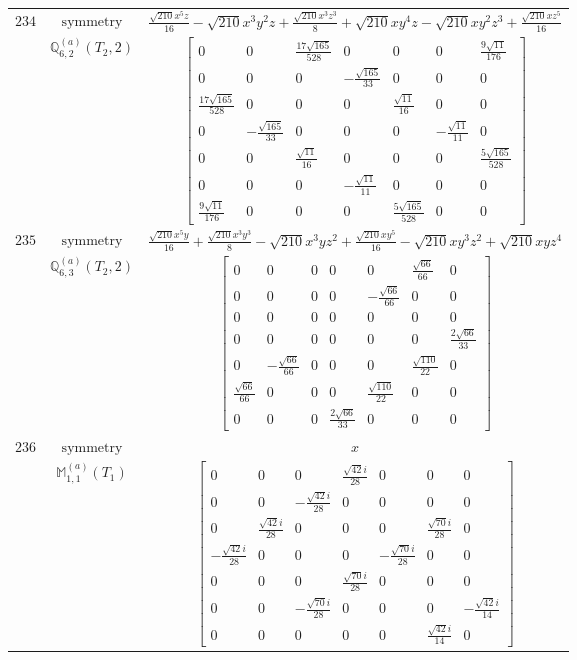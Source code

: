 \documentclass[fleqn,8pt,landscape]{jsarticle}
\begin{document}
\begin{longtable}{ccc}
$ 234 $ & $ \text{symmetry} $ & $ \frac{\sqrt{210} x^{5} z}{16} - \sqrt{210} x^{3} y^{2} z + \frac{\sqrt{210} x^{3} z^{3}}{8} + \sqrt{210} x y^{4} z - \sqrt{210} x y^{2} z^{3} + \frac{\sqrt{210} x z^{5}}{16} $ \\
$  $ & $ \mathbb{Q}_{6,2}^{(a)}(T_{2},2) $ & $ \begin{bmatrix} 0 & 0 & \frac{17 \sqrt{165}}{528} & 0 & 0 & 0 & \frac{9 \sqrt{11}}{176} \\ 0 & 0 & 0 & - \frac{\sqrt{165}}{33} & 0 & 0 & 0 \\ \frac{17 \sqrt{165}}{528} & 0 & 0 & 0 & \frac{\sqrt{11}}{16} & 0 & 0 \\ 0 & - \frac{\sqrt{165}}{33} & 0 & 0 & 0 & - \frac{\sqrt{11}}{11} & 0 \\ 0 & 0 & \frac{\sqrt{11}}{16} & 0 & 0 & 0 & \frac{5 \sqrt{165}}{528} \\ 0 & 0 & 0 & - \frac{\sqrt{11}}{11} & 0 & 0 & 0 \\ \frac{9 \sqrt{11}}{176} & 0 & 0 & 0 & \frac{5 \sqrt{165}}{528} & 0 & 0 \end{bmatrix} $ \\ \hline
$ 235 $ & $ \text{symmetry} $ & $ \frac{\sqrt{210} x^{5} y}{16} + \frac{\sqrt{210} x^{3} y^{3}}{8} - \sqrt{210} x^{3} y z^{2} + \frac{\sqrt{210} x y^{5}}{16} - \sqrt{210} x y^{3} z^{2} + \sqrt{210} x y z^{4} $ \\
$  $ & $ \mathbb{Q}_{6,3}^{(a)}(T_{2},2) $ & $ \begin{bmatrix} 0 & 0 & 0 & 0 & 0 & \frac{\sqrt{66}}{66} & 0 \\ 0 & 0 & 0 & 0 & - \frac{\sqrt{66}}{66} & 0 & 0 \\ 0 & 0 & 0 & 0 & 0 & 0 & 0 \\ 0 & 0 & 0 & 0 & 0 & 0 & \frac{2 \sqrt{66}}{33} \\ 0 & - \frac{\sqrt{66}}{66} & 0 & 0 & 0 & \frac{\sqrt{110}}{22} & 0 \\ \frac{\sqrt{66}}{66} & 0 & 0 & 0 & \frac{\sqrt{110}}{22} & 0 & 0 \\ 0 & 0 & 0 & \frac{2 \sqrt{66}}{33} & 0 & 0 & 0 \end{bmatrix} $ \\ \hline
$ 236 $ & $ \text{symmetry} $ & $ x $ \\
$  $ & $ \mathbb{M}_{1,1}^{(a)}(T_{1}) $ & $ \begin{bmatrix} 0 & 0 & 0 & \frac{\sqrt{42} i}{28} & 0 & 0 & 0 \\ 0 & 0 & - \frac{\sqrt{42} i}{28} & 0 & 0 & 0 & 0 \\ 0 & \frac{\sqrt{42} i}{28} & 0 & 0 & 0 & \frac{\sqrt{70} i}{28} & 0 \\ - \frac{\sqrt{42} i}{28} & 0 & 0 & 0 & - \frac{\sqrt{70} i}{28} & 0 & 0 \\ 0 & 0 & 0 & \frac{\sqrt{70} i}{28} & 0 & 0 & 0 \\ 0 & 0 & - \frac{\sqrt{70} i}{28} & 0 & 0 & 0 & - \frac{\sqrt{42} i}{14} \\ 0 & 0 & 0 & 0 & 0 & \frac{\sqrt{42} i}{14} & 0 \end{bmatrix} $ \\ \hline

\end{longtable}
\end{document}
